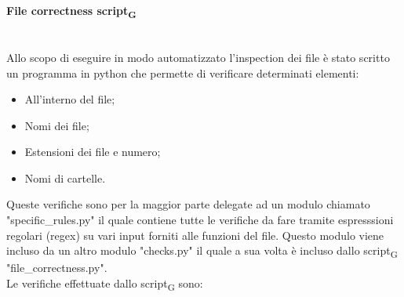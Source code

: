 \paragraph{File correctness script\textsubscript{G}}\mbox{}\\
Allo scopo di eseguire in modo automatizzato l'inspection dei file è stato scritto un programma in python che permette di verificare determinati elementi:
\begin{itemize}
	\item All'interno del file;
	\item Nomi dei file;
	\item Estensioni dei file e numero;
	\item Nomi di cartelle.
\end{itemize}
\noindent Queste verifiche sono per la maggior parte delegate ad un modulo chiamato "specific\_rules.py" il quale contiene tutte le verifiche da fare tramite espresssioni regolari (regex) su vari input forniti alle funzioni del file. Questo modulo viene incluso da un altro modulo "checks.py" il quale a sua volta è incluso dallo script\textsubscript{G} "file\_correctness.py".\\
\noindent Le verifiche effettuate dallo script\textsubscript{G} sono:
